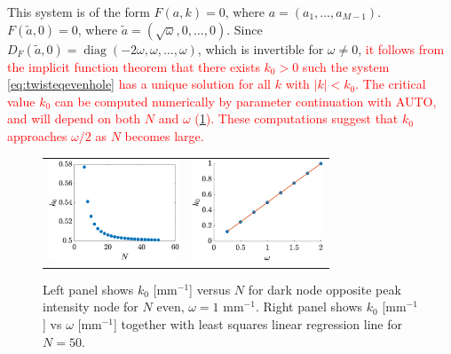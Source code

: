 \documentclass[reprint, amsmath,amssymb,aps,pra]{revtex4-2}
\DeclareMathOperator{\diag}{diag}
\renewcommand{\revised}[1]{ \textcolor{red}{#1} }
\begin{document}
This system is of the form $F(a,k) = 0$, where $a = (a_1, \dots, a_{M-1})$. $F(\tilde{a}, 0) = 0$, where $\tilde{a} = (\sqrt{\omega}, 0, \dots, 0)$. Since $D_F(\tilde{a}, 0) = \diag(-2\omega,\omega, \dots, \omega)$, which is invertible for $\omega \neq 0$, \revised{it follows from the implicit function theorem that there exists $k_0 > 0$ such the system \cref{eq:twisteqevenhole} has a unique solution for all $k$ with $|k| < k_0$. The critical value $k_0$ can be computed numerically by parameter continuation with AUTO, and will depend on both $N$ and $\omega$ (\cref{fig:k0plot}). These computations suggest that $k_0$ approaches $\omega/2$ as $N$ becomes large.}

\begin{figure}
    \begin{center}
    \begin{tabular}{cc}
    \includegraphics[width=3.9cm]{images/k0vsN} &
    \includegraphics[width=3.9cm]{images/k0vsomega.eps}
    \end{tabular}
    \end{center}
    \caption{Left panel shows $k_0$ [$\text{mm}^{-1}$] versus $N$ for dark node opposite peak intensity node for $N$ even, $\omega = 1 \text{ mm}^{-1}$. Right panel shows $k_0$ [$\text{mm}^{-1}$] vs $\omega$ [$\text{mm}^{-1}$] together with least squares linear regression line for $N = 50$.}
    \label{fig:k0plot}
\end{figure}
\end{document}
